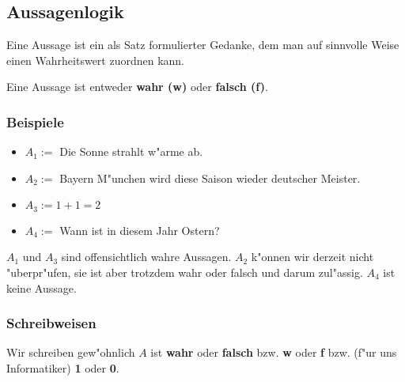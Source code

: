 \subsection{Aussagenlogik}
\begin{definition}[Aussage]
Eine Aussage ist ein als Satz formulierter Gedanke, dem man auf sinnvolle Weise einen Wahrheitswert zuordnen kann.
\end{definition}

\begin{axiom}
Eine Aussage ist entweder \textbf{wahr (w)} oder \textbf{falsch (f)}.
\end{axiom}

\subsubsection*{Beispiele}
\begin{itemize}
\item $A_1 := $ Die Sonne strahlt w"arme ab.
\item $A_2 := $ Bayern M"unchen wird diese Saison wieder deutscher Meister.
\item $A_3 := 1+1 = 2$
\item $A_4 := $ Wann ist in diesem Jahr Ostern?
\end{itemize}
$A_1$ und $A_3$ sind offensichtlich wahre Aussagen. $A_2$ k"onnen wir derzeit nicht "uberpr"ufen, sie ist aber trotzdem wahr oder falsch und darum zul"assig. $A_4$ ist keine Aussage.

\subsubsection*{Schreibweisen}
Wir schreiben gew"ohnlich $A$ ist \textbf{wahr} oder \textbf{falsch} bzw. \textbf{w} oder \textbf{f} bzw. (f"ur uns Informatiker) \textbf{1} oder \textbf{0}.

